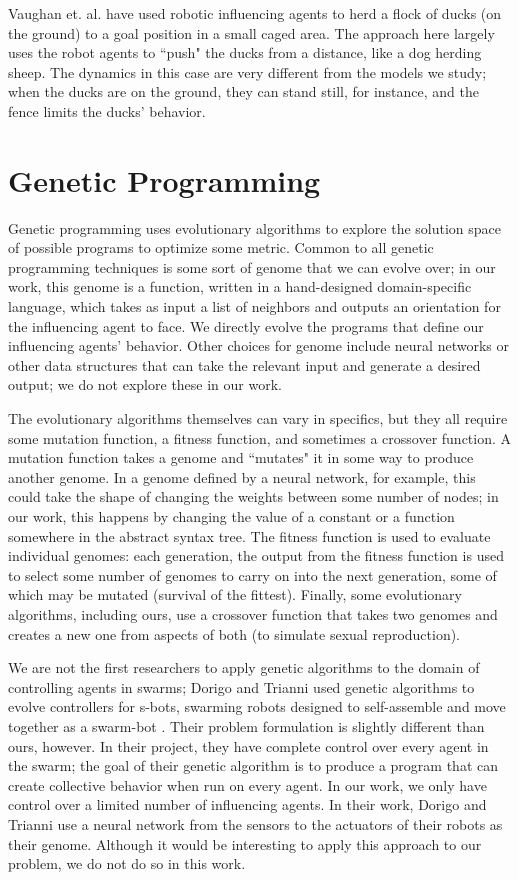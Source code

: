 Vaughan et. al. \cite{vaughan98} have used robotic influencing agents to herd
a flock of ducks (on the ground) to a goal position in a small caged area.
The approach here largely uses the robot agents to ``push" the ducks from a
distance, like a dog herding sheep.
The dynamics in this case are very different from the models we study; when the
ducks are on the ground, they can stand still, for instance, and the fence
limits the ducks' behavior.

\section{Genetic Programming}
Genetic programming \cite{kozaGP} uses evolutionary algorithms to explore the
solution space of possible programs to optimize some metric.
Common to all genetic programming techniques is some sort of genome that we can
evolve over; in our work, this genome is a function, written in a hand-designed
domain-specific language, which takes as input a list of neighbors and outputs
an orientation for the influencing agent to face.
We directly evolve the programs that define our influencing agents' behavior.
Other choices for genome include neural networks or other data structures that
can take the relevant input and generate a desired output; we do not explore
these in our work.

The evolutionary algorithms themselves can vary in specifics, but they all
require some mutation function, a fitness function, and sometimes a crossover
function.
A mutation function takes a genome and ``mutates" it in some way to produce
another genome.
In a genome defined by a neural network, for example, this could take the shape
of changing the weights between some number of nodes; in our work, this happens
by changing the value of a constant or a function somewhere in the abstract
syntax tree.
The fitness function is used to evaluate individual genomes: each generation,
the output from the fitness function is used to select some number of genomes
to carry on into the next generation, some of which may be mutated (survival of
the fittest).
Finally, some evolutionary algorithms, including ours, use a crossover function
that takes two genomes and creates a new one from aspects of both (to simulate
sexual reproduction).

We are not the first researchers to apply genetic algorithms to the domain
of controlling agents in swarms; Dorigo and Trianni used genetic algorithms to
evolve controllers for s-bots, swarming robots designed to self-assemble and
move together as a swarm-bot \cite{DorigoSwarmBot}.
Their problem formulation is slightly different than ours, however.
In their project, they have complete control over every agent in the swarm;
the goal of their genetic algorithm is to produce a program that can create
collective behavior when run on every agent.
In our work, we only have control over a limited number of influencing agents.
In their work, Dorigo and Trianni use a neural network from the sensors to the
actuators of their robots as their genome.
Although it would be interesting to apply this approach to our problem, we do
not do so in this work.

